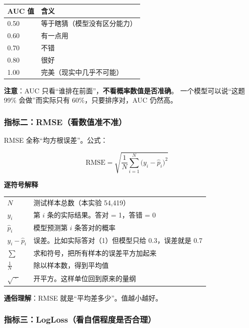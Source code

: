 \documentclass[UTF8,a4paper,11pt]{ctexart}
\newenvironment{explainbox}[1]
{\begin{center}\begin{minipage}{0.94\textwidth}\colorbox{boxbg}{\parbox{0.92\textwidth}{\textbf{#1}\par\vspace{2pt}}}}
{\end{minipage}\end{center}}
\newcommand{\hl}[1]{\textcolor{blue!70!black}{\textbf{#1}}}
\begin{document}
\begin{center}
\begin{tabular}{p{3.0cm}p{10.8cm}}
\toprule
\textbf{AUC 值} & \textbf{含义} \\
\midrule
0.50 & 等于瞎猜（模型没有区分能力） \\
0.60 & 有一点用 \\
0.70 & 不错 \\
0.80 & 很好 \\
1.00 & 完美（现实中几乎不可能） \\
\bottomrule
\end{tabular}
\end{center}

\textbf{注意}：AUC 只看“谁排在前面”，\hl{不看概率数值是否准确}。
一个模型可以说“这题 99\% 会做”而实际只有 60\%，只要排序对，AUC 仍然高。

\subsubsection{指标二：RMSE（看数值准不准）}

RMSE 全称“均方根误差”。公式：

\begin{equation}
\text{RMSE} = \sqrt{\frac{1}{N}\sum_{i=1}^{N}\big(y_i - \hat{p}_i\big)^2}
\label{p1:eq:rmse}
\end{equation}

\begin{explainbox}{逐符号解释}
\begin{longtable}{@{}p{2.2cm}p{11.6cm}@{}}
$N$ & 测试样本总数（本实验 54,419） \\
$y_i$ & 第 $i$ 条的实际结果。答对 = 1，答错 = 0 \\
$\hat{p}_i$ & 模型预测第 $i$ 条答对的概率 \\
$y_i - \hat{p}_i$ & 误差。比如实际答对（1）但模型只给 0.3，误差就是 0.7 \\
$\sum$ & 求和符号，把所有样本的误差平方加起来 \\
$\frac{1}{N}$ & 除以样本数，得到平均值 \\
$\sqrt{\;\cdot\;}$ & 开平方。这样单位回到原来的量纲 \\
\end{longtable}
\end{explainbox}

\textbf{通俗理解}：RMSE 就是“平均差多少”。值越小越好。

\subsubsection{指标三：LogLoss（看自信程度是否合理）}
\end{document}
